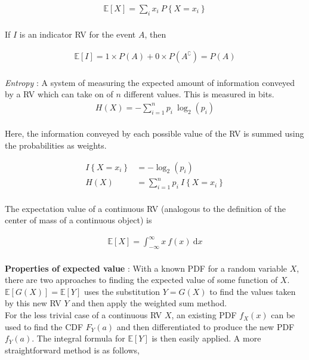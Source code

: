 \begin{align}
	\mathbb{E}[X] = \sum\limits_{i} x_i\ P \left\{ X = x_i \right\} 
\end{align}\\

If $ I $ is an indicator RV for the event $ A $, then 

\begin{align}
	\mathbb{E}[I] = 1 \times P(A) + 0 \times P(A^\complement) = P(A)
\end{align}\\

\textit{Entropy} : A system of measuring the expected amount of information conveyed by a RV which can take on of $ n $ different values. This is measured in bits. \\

\begin{align}
	H(X) = -\sum\limits_{i = 1}^{n} p_i \ \log_{2}(p_i)
\end{align} \\

Here, the information conveyed by each possible value of the RV is summed using the probabilities as weights.

\begin{align}
	I\left\{X = x_i\right\} &= -\log_{2}(p_i) \\
	H(X) &= \sum\limits_{i = 1}^{n} p_i \ I\left\{X = x_i\right\}
\end{align}\\

The expectation value of a continuous RV (analogous to the definition of the center of mass of a continuous object) is

\begin{align}
	\mathbb{E}[X] = \int_{-\infty}^{\infty} x\ f(x)\ \mathrm{d}x
\end{align} \\

\textbf{Properties of expected value} : With a known PDF for a random variable $ X $, there are two approaches to finding the expected value of some function of $ X $. \\

$ \mathbb{E}[G(X)] = \mathbb{E}[Y] $ uses the substitution $ Y = G(X) $ to find the values taken by this new RV $ Y $ and then apply the weighted sum method. \\

For the less trivial case of a continuous RV $ X $, an existing PDF $ f_X (x) $ can be used to find the CDF $ F_Y(a) $ and then differentiated to produce the new PDF $ f_Y(a) $. The integral formula for $ \mathbb{E}[Y] $ is then easily applied. A more straightforward method is as follows, 

